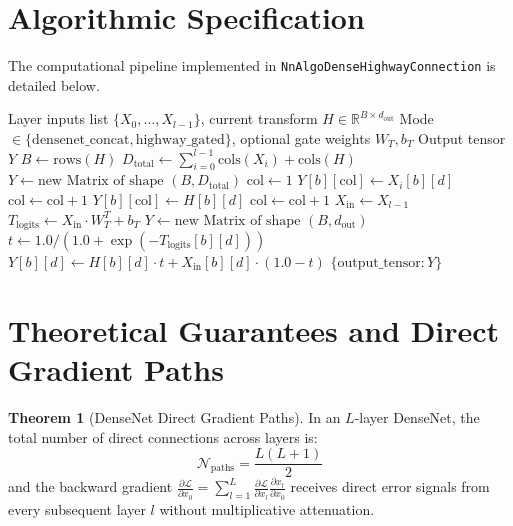 \documentclass[11pt,a4paper]{article}
\theoremstyle{definition}
\newtheorem{theorem}{Theorem}[section]
\begin{document}
\section{Algorithmic Specification}

The computational pipeline implemented in \texttt{NnAlgoDenseHighwayConnection} is detailed below.

\begin{algorithm}[H]
\caption{DenseNet / Highway Connection Forward Evaluation}
\begin{algorithmic}[1]
\Require Layer inputs list $\{X_0, \dots, X_{l-1}\}$, current transform $H \in \mathbb{R}^{B \times d_{\text{out}}}$
\Require Mode $\in \{\text{densenet\_concat}, \text{highway\_gated}\}$, optional gate weights $W_T, b_T$
\Ensure Output tensor $Y$
\State $B \gets \text{rows}(H)$
    \State $D_{\text{total}} \gets \sum_{i=0}^{l-1} \text{cols}(X_i) + \text{cols}(H)$
    \State $Y \gets \text{new Matrix of shape } (B, D_{\text{total}})$
        \State $\text{col} \gets 1$
                \State $Y[b][\text{col}] \gets X_i[b][d]$
                \State $\text{col} \gets \text{col} + 1$
            \EndFor
        \EndFor
            \State $Y[b][\text{col}] \gets H[b][d]$
            \State $\text{col} \gets \text{col} + 1$
        \EndFor
    \EndFor
\Else
    \State $X_{\text{in}} \gets X_{l-1}$
    \State $T_{\text{logits}} \gets X_{\text{in}} \cdot W_T^T + b_T$
    \State $Y \gets \text{new Matrix of shape } (B, d_{\text{out}})$
            \State $t \gets 1.0 / (1.0 + \exp(-T_{\text{logits}}[b][d]))$
            \State $Y[b][d] \gets H[b][d] \cdot t + X_{\text{in}}[b][d] \cdot (1.0 - t)$
        \EndFor
    \EndFor
\EndIf
\State \Return $\{\text{output\_tensor}: Y\}$
\end{algorithmic}
\end{algorithm}

\section{Theoretical Guarantees and Direct Gradient Paths}

\begin{theorem}[DenseNet Direct Gradient Paths]
In an $L$-layer DenseNet, the total number of direct connections across layers is:
\begin{equation}
\mathcal{N}_{\text{paths}} = \frac{L(L + 1)}{2}
\end{equation}
and the backward gradient $\frac{\partial \mathcal{L}}{\partial x_0} = \sum_{l=1}^L \frac{\partial \mathcal{L}}{\partial x_l} \frac{\partial x_l}{\partial x_0}$ receives direct error signals from every subsequent layer $l$ without multiplicative attenuation.
\end{theorem}
\end{document}
